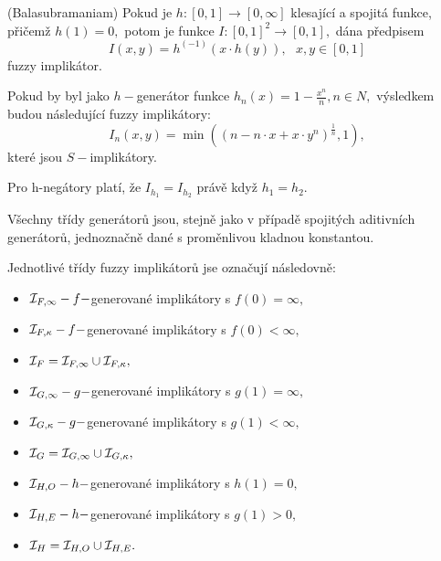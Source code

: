 \begin{sentence}(Balasubramaniam) 
Pokud je $h: [0,1] \to [0,\infty]$ klesající a spojitá funkce,
přičemž $h(1) = 0,$ potom je funkce $I: [0,1]^2 \to [0,1],$ dána předpisem
$$I(x,y) = h^{(-1)}(x \cdot h(y)), \mbox {   } x, y \in [0,1]$$
fuzzy implikátor. \\
\end{sentence}
\begin{example}
    Pokud by byl jako  $h-$generátor funkce $h_n(x) = 1- \frac {x^n}{n}, n
    \in N,$ výsledkem budou následující fuzzy implikátory:
    $$I_n(x,y) = \min \left ( (n - n \cdot x + x \cdot y^n)^{\frac 1n}, 1\right
    ),$$
    kter\'e jsou $S-$implikátory.
\end{example}
\begin{remark}
    Pro h-negátory platí, že $I_{h_1} = I_{h_2}$ právě když $h_1 = h_2.$
\end{remark}

Všechny třídy generátor\r u jsou, stejně jako v případě spojitých aditivních generátor\r u, jednoznačně dané s proměnlivou kladnou konstantou.

Jednotlivé třídy fuzzy implikátor\r u jse označují následovně:
\begin{itemize}
\item ${\cal I}_{F, \infty}- f-$generované implikátory s $f(0) = \infty,$ 
\item ${\cal I}_{F, \kappa}- f-$generované implikátory s $f(0) < \infty,$ 
\item ${\cal I}_{F} = {\cal I}_{F, \infty} \cup{\cal I}_{F, \kappa}, $
\item ${\cal I}_{G, \infty} - g-$generované implikátory s $g(1) = \infty,$ 
\item ${\cal I}_{G, \kappa} - g-$generované implikátory s $g(1) < \infty,$ 
\item ${\cal I}_{G}={\cal I}_{G, \infty} \cup{\cal I}_{G, \kappa},$ 
\item ${\cal I}_{H, O} - h-$generované implikátory s $h(1) = 0,$ 
\item ${\cal I}_{H, E} - h-$generované implikátory s $g(1) >0,$ 
\item ${\cal I}_{H}= {\cal I}_{H, O} \cup {\cal I}_{H, E}.$ 
\end{itemize} 



